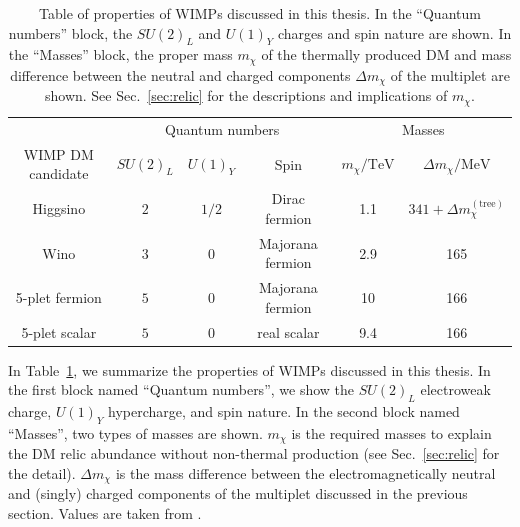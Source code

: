 \documentclass[12pt,twoside,book]{article}
\begin{document}
\begin{table}[t]
  \centering
  \begin{tabular}{c|ccc|cc}
    & \multicolumn{3}{c|}{Quantum numbers} & \multicolumn{2}{c}{Masses}\\
    WIMP DM candidate & $SU(2)_L$ & $U(1)_Y$ & Spin & $m_\chi / \mathrm{TeV}$ &
    $\Delta m_\chi / \mathrm{MeV}$ \\
    \hline
    Higgsino & $2$ & $1/2$ & Dirac fermion & 1.1 & $341 + \Delta m_\chi^{\mathrm{(tree)}}$ \\
    Wino & $3$ & $0$ & Majorana fermion & 2.9 & 165 \\
    5-plet fermion & $5$ & $0$ & Majorana fermion & 10 & 166\\
    5-plet scalar & $5$ & $0$ & real scalar & 9.4 & 166
  \end{tabular}
  \caption{
    Table of properties of WIMPs discussed in this thesis.
    In the ``Quantum numbers'' block, the $SU(2)_L$ and $U(1)_Y$ charges and spin nature are shown.
    In the ``Masses'' block, the proper mass $m_\chi$ of the thermally produced DM and mass difference between the neutral and charged components $\Delta m_\chi$ of the multiplet are shown.
    See Sec.~\ref{sec:relic} for the descriptions and implications of $m_\chi$.
  }
  \label{tab:WIMP_property}
\end{table}

In Table~\ref{tab:WIMP_property}, we summarize the properties of WIMPs discussed in this thesis.
In the first block named ``Quantum numbers'', we show the $SU(2)_L$ electroweak charge, $U(1)_Y$ hypercharge, and spin nature.
In the second block named ``Masses'', two types of masses are shown.
$m_\chi$ is the required masses to explain the DM relic abundance without non-thermal production (see Sec.~\ref{sec:relic} for the detail).
$\Delta m_\chi$ is the mass difference between the electromagnetically neutral and (singly) charged components of the multiplet discussed in the previous section.
Values are taken from \cite{Farina:2013mla, ArkaniHamed:2006mb, Hisano:2006nn,  Cirelli:2007xd, Moroi:2013sla, Beneke:2016ync}.

% 
% 
\end{document}
